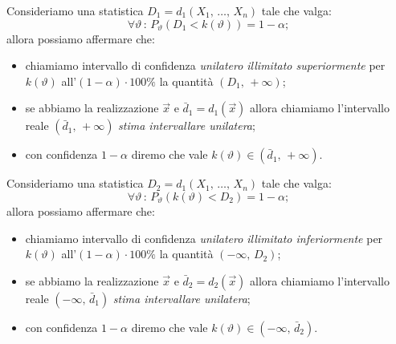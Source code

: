         \begin{defn}
            Consideriamo una statistica $D_1 = d_1(X_1,\, \ldots,\, X_{n})$ tale che valga: \[
                \forall \vartheta \,:\, P_\vartheta(D_1 < k(\vartheta)) = 1-\alpha
            ;\] allora possiamo affermare che:
            \begin{itemize}
                \item chiamiamo intervallo di confidenza \emph{unilatero illimitato superiormente} per 
                    $k(\vartheta)$ all'$(1-\alpha)\cdot 100\%$ la quantità $(D_1,\, +\infty)$;
                \item se abbiamo la realizzazione $\vec{x}$ e $\bar{d}_1 = d_1(\vec{x})$ allora chiamiamo 
                    l'intervallo reale $(\bar{d}_1,\, +\infty)$ \emph{stima intervallare unilatera};
                \item con confidenza $1-\alpha$ diremo che vale $k(\vartheta) \in (\bar{d}_1,\, +\infty)$.
            \end{itemize}
        \end{defn}
        \begin{defn}
            Consideriamo una statistica $D_2 = d_1(X_1,\, \ldots,\, X_{n})$ tale che valga: \[
                \forall \vartheta \,:\, P_\vartheta(k(\vartheta) < D_2) = 1-\alpha
            ;\] allora possiamo affermare che:
            \begin{itemize}
                \item chiamiamo intervallo di confidenza \emph{unilatero illimitato inferiormente} per 
                    $k(\vartheta)$ all'$(1-\alpha)\cdot 100\%$ la quantità $(-\infty,\, D_2)$;
                \item se abbiamo la realizzazione $\vec{x}$ e $\bar{d}_2 = d_2(\vec{x})$ allora chiamiamo 
                    l'intervallo reale $(-\infty,\, \bar{d}_1)$ \emph{stima intervallare unilatera};
                \item con confidenza $1-\alpha$ diremo che vale $k(\vartheta) \in (-\infty,\, \bar{d}_2)$.
            \end{itemize}
        \end{defn}
